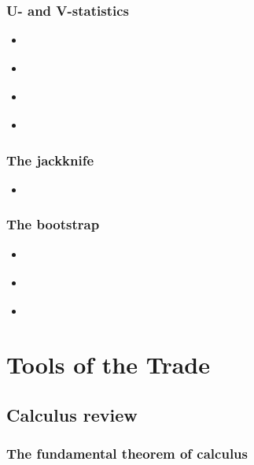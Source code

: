 \documentclass{report}
\begin{document}
\subsection{U- and V-statistics}

\begin{itemize}
    \item \cite[Chapter~12]{van_der_vaart_asymptotic_1998}
    \item \cite[Chapter~15]{dasgupta_asymptotic_2008}
    \item \cite[Chapter~6.1]{lehmann_elements_1999}
    \item \cite[Chapter~5]{serfling_approximation_1980}
\end{itemize}

\subsection{The jackknife}

\begin{itemize}
    \item \cite[Chapter~30]{dasgupta_asymptotic_2008}
\end{itemize}

\subsection{The bootstrap}

\begin{itemize}
    \item \cite[Chapter~23]{van_der_vaart_asymptotic_1998}
    \item \cite[Chapter~29]{dasgupta_asymptotic_2008}
    \item \cite[Chapter~10.1]{casella_statistical_2002}
\end{itemize}


\chapter{Tools of the Trade} \label{chap:tools-of-the-trade}

\section{Calculus review}\label{sec:tools-calculus}

\subsection{The fundamental theorem of calculus}
\end{document}
